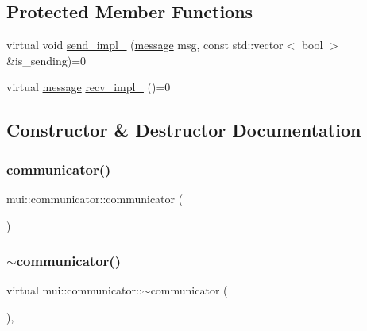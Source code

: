 \subsection*{Protected Member Functions}
\begin{DoxyCompactItemize}
\item 
virtual void \hyperlink{classmui_1_1communicator_a1fccb014ae855d7b7d0fc53f7f22b9aa}{send\+\_\+impl\+\_\+} (\hyperlink{structmui_1_1message}{message} msg, const std\+::vector$<$ bool $>$ \&is\+\_\+sending)=0
\item 
virtual \hyperlink{structmui_1_1message}{message} \hyperlink{classmui_1_1communicator_ab52ebf7dd059acdd144493cd76c62c5f}{recv\+\_\+impl\+\_\+} ()=0
\end{DoxyCompactItemize}


\subsection{Constructor \& Destructor Documentation}
\mbox{\label{classmui_1_1communicator_a115082ed8993d41bb492e985041e86e4}} 
\subsubsection{\texorpdfstring{communicator()}{communicator()}}
{\footnotesize\ttfamily mui\+::communicator\+::communicator (\begin{DoxyParamCaption}{ }\end{DoxyParamCaption})\hspace{0.3cm}{\ttfamily [inline]}}

\mbox{\label{classmui_1_1communicator_aa7f8c2ace12e778f7f710a3058953c44}} 
\subsubsection{\texorpdfstring{$\sim$communicator()}{~communicator()}}
{\footnotesize\ttfamily virtual mui\+::communicator\+::$\sim$communicator (\begin{DoxyParamCaption}{ }\end{DoxyParamCaption})\hspace{0.3cm}{\ttfamily [inline]}, {\ttfamily [virtual]}}



